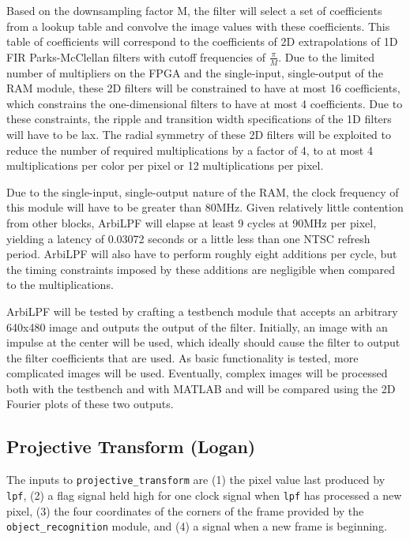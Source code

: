 \documentclass[10pt]{article}
\begin{document}
Based on the downsampling factor M, the filter will select a set of coefficients from a lookup table and convolve the image values with these coefficients. This table of coefficients will correspond to the coefficients of 2D extrapolations of 1D FIR Parks-McClellan filters with cutoff frequencies of \( \frac{\pi}{M} \). Due to the limited number of multipliers on the FPGA and the single-input, single-output of the RAM module, these 2D filters will be constrained to have at most 16 coefficients, which constrains the one-dimensional filters to have at most 4 coefficients. Due to these constraints, the ripple and transition width specifications of the 1D filters will have to be lax. The radial symmetry of these 2D filters will be exploited to reduce the number of required multiplications by a factor of 4, to at most 4 multiplications per color per pixel or 12 multiplications per pixel.

Due to the single-input, single-output nature of the RAM, the clock frequency of this module will have to be greater than 80MHz. Given relatively little contention from other blocks, ArbiLPF will elapse at least 9 cycles at 90MHz per pixel, yielding a latency of 0.03072 seconds or a little less than one NTSC refresh period. ArbiLPF will also have to perform roughly eight additions per cycle, but the timing constraints imposed by these additions are negligible when compared to the multiplications.

ArbiLPF will be tested by crafting a testbench module that accepts an arbitrary 640x480 image and outputs the output of the filter. Initially, an image with an impulse at the center will be used, which ideally should cause the filter to output the filter coefficients that are used. As basic functionality is tested, more complicated images will be used. Eventually, complex images will be processed both with the testbench and with MATLAB and will be compared using the 2D Fourier plots of these two outputs.

\subsection{Projective Transform (Logan)}
The inputs to {\tt projective\_transform} are (1) the pixel value last produced by {\tt lpf}, (2) a flag signal held high for one clock signal when {\tt lpf} has processed a new pixel, (3) the four coordinates of the corners of the frame provided by the {\tt object\_recognition} module, and (4) a signal when a new frame is beginning.
\end{document}
